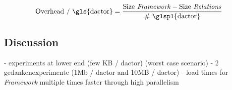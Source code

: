   \begin{equation}
    \text{Overhead / \gls{dactor}} = \frac{\text{Size \textit{Framework}} - \text{Size \textit{Relations}}}{\text{\# \glspl{dactor}}}
  \end{equation}

\subsection{Discussion}

  - experiments at lower end (few KB / dactor) (worst case scenario)
  - 2 gedankenexperimente (1Mb / dactor and 10MB / dactor)
  - load times for \textit{Framework} multiple times faster through high parallelism